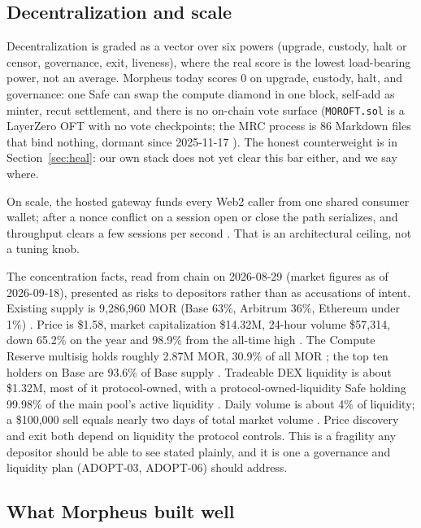 \documentclass[11pt,a4paper]{article}
\newcommand{\code}[1]{\texttt{\small #1}}
\newcommand{\prov}[1]{{\color{muted}\footnotesize\sffamily[#1]}}
\begin{document}
\subsection{Decentralization and scale}

Decentralization is graded as a vector over six powers (upgrade, custody, halt or censor,
governance, exit, liveness), where the real score is the lowest load-bearing power, not an
average. Morpheus today scores 0 on upgrade, custody, halt, and governance: one Safe can swap
the compute diamond in one block, self-add as minter, recut settlement, and there is no
on-chain vote surface (\code{MOROFT.sol} is a LayerZero OFT with no vote checkpoints; the MRC
process is 86 Markdown files that bind nothing, dormant since 2025-11-17 \prov{verified}). The
honest counterweight is in Section~\ref{sec:heal}: our own stack does not yet clear this bar
either, and we say where.

On scale, the hosted gateway funds every Web2 caller from one shared consumer wallet; after a
nonce conflict on a session open or close the path serializes, and throughput clears a few
sessions per second \prov{verified}. That is an architectural ceiling, not a tuning knob.

The concentration facts, read from chain on 2026-08-29 (market figures as of 2026-09-18), presented as risks to
depositors rather than as accusations of intent. Existing supply is 9,286,960 MOR (Base 63\%,
Arbitrum 36\%, Ethereum under 1\%) \prov{verified}. Price is \$1.58, market capitalization
\$14.32M, 24-hour volume \$57,314, down 65.2\% on the year and 98.9\% from the all-time high
\prov{verified}. The Compute Reserve multisig holds roughly 2.87M MOR, 30.9\% of all MOR
\prov{verified}; the top ten holders on Base are 93.6\% of Base supply \prov{verified}. Tradeable
DEX liquidity is about \$1.32M, most of it protocol-owned, with a protocol-owned-liquidity
Safe holding 99.98\% of the main pool's active liquidity \prov{verified}. Daily volume is about 4\%
of liquidity; a \$100,000 sell equals nearly two days of total market volume \prov{derived}.
Price discovery and exit both depend on liquidity the protocol controls. This is a fragility any
depositor should be able to see stated plainly, and it is one a governance and liquidity plan
(ADOPT-03, ADOPT-06) should address.

\subsection{What Morpheus built well}
\end{document}
